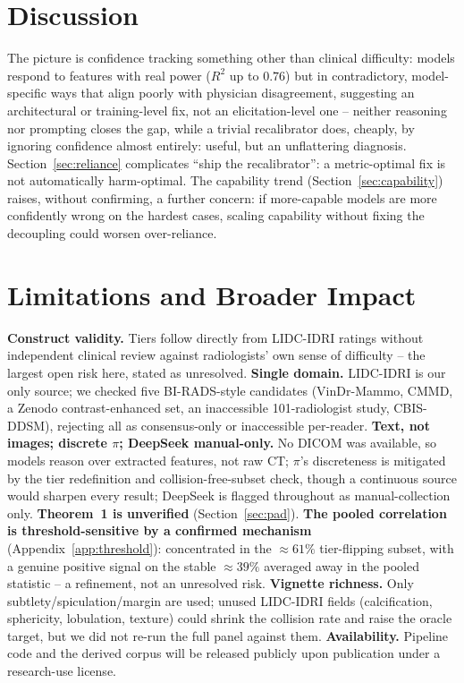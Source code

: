 \documentclass[letterpaper]{article} %
\begin{document}
\section{Discussion}
The picture is confidence tracking something other than clinical difficulty:
models respond to features with real power ($R^2$ up to $0.76$) but in
contradictory, model-specific ways that align poorly with physician
disagreement, suggesting an architectural or training-level fix, not an
elicitation-level one -- neither reasoning nor prompting closes the gap,
while a trivial recalibrator does, cheaply, by ignoring confidence almost
entirely: useful, but an unflattering diagnosis. Section~\ref{sec:reliance}
complicates ``ship the recalibrator'': a metric-optimal fix is not
automatically harm-optimal. The capability trend
(Section~\ref{sec:capability}) raises, without confirming, a further
concern: if more-capable models are more confidently wrong on the hardest
cases, scaling capability without fixing the decoupling could worsen
over-reliance.

\section{Limitations and Broader Impact}
\textbf{Construct validity.} Tiers follow directly from LIDC-IDRI ratings
without independent clinical review against radiologists' own sense of
difficulty -- the largest open risk here, stated as unresolved.
\textbf{Single domain.} LIDC-IDRI is our only source; we checked five
BI-RADS-style candidates (VinDr-Mammo, CMMD, a Zenodo contrast-enhanced set,
an inaccessible 101-radiologist study, CBIS-DDSM), rejecting all as
consensus-only or inaccessible per-reader. \textbf{Text, not images;
discrete $\pi$; DeepSeek manual-only.} No DICOM was available, so models
reason over extracted features, not raw CT; $\pi$'s discreteness is
mitigated by the tier redefinition and collision-free-subset check, though a
continuous source would sharpen every result; DeepSeek is flagged
throughout as manual-collection only.
\textbf{Theorem~1 is unverified} (Section~\ref{sec:pad}).
\textbf{The pooled correlation is threshold-sensitive by a confirmed
mechanism} (Appendix~\ref{app:threshold}): concentrated in the
$\approx61\%$ tier-flipping subset, with a genuine positive signal on the
stable $\approx39\%$ averaged away in the pooled statistic -- a refinement,
not an unresolved risk. \textbf{Vignette richness.} Only
subtlety/spiculation/margin are used; unused LIDC-IDRI fields (calcification,
sphericity, lobulation, texture) could shrink the collision rate and raise
the oracle target, but we did not re-run the full panel against them.
\textbf{Availability.} Pipeline code and the derived corpus will be released
publicly upon publication under a research-use license.
\end{document}
